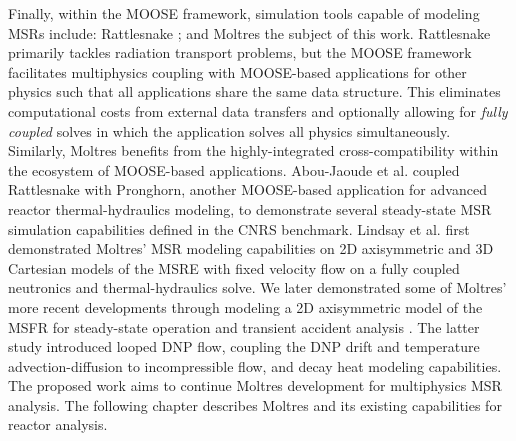 Finally, within the MOOSE framework,
simulation tools capable of modeling
\glspl{MSR} include: Rattlesnake \cite{wang_rattlesnake_2021}; and Moltres
\cite{lindsay_moltres_2017}\textemdash the subject of this work.
Rattlesnake primarily tackles radiation transport problems, but the MOOSE
framework facilitates multiphysics coupling
with MOOSE-based applications for other physics
such that all applications share the same data structure. This eliminates
computational costs from external data transfers and optionally allowing for
\textit{fully coupled} solves in which the application solves all physics
simultaneously. Similarly, Moltres benefits from the highly-integrated
cross-compatibility
within the ecosystem of MOOSE-based applications. Abou-Jaoude et al.
\cite{abou-jaoude_coupled_2020} coupled Rattlesnake with Pronghorn, another
MOOSE-based application for advanced reactor thermal-hydraulics modeling, to
demonstrate several steady-state \gls{MSR} simulation capabilities defined in
the CNRS benchmark. Lindsay et al.
\cite{lindsay_introduction_2018} first demonstrated Moltres' \gls{MSR} modeling
capabilities on 2D axisymmetric and 3D Cartesian models of the \gls{MSRE} with
fixed velocity flow on a fully coupled neutronics and thermal-hydraulics solve.
We later demonstrated some of Moltres' more recent developments through
modeling a 2D axisymmetric model of the \gls{MSFR} for steady-state operation
and transient accident analysis \cite{park_advancement_2020}. The latter study
introduced looped \gls{DNP} flow, coupling the \gls{DNP} drift and temperature 
advection-diffusion to incompressible flow, and decay heat modeling
capabilities. The proposed work aims to continue Moltres development for
multiphysics \gls{MSR} analysis. The following chapter describes Moltres and
its existing capabilities for reactor analysis.
